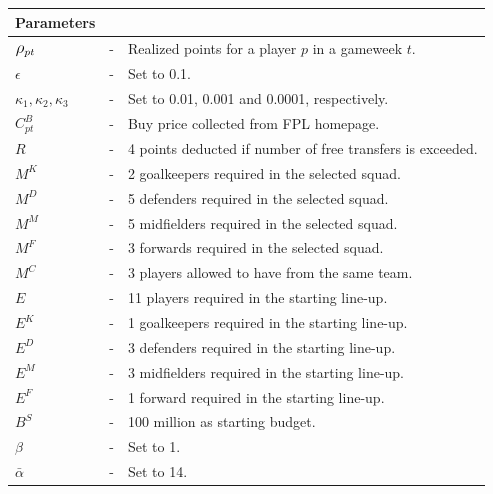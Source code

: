 \begin{table}[H] 
\tabcolsep=0.11cm
\centering
\begin{tabular}{@{}lll@{}}
\toprule
Parameters                       &   &                                                                                                \\ \midrule
$\mathlarger{\rho_{pt}}$ & - & Realized points for a player $p$ in a gameweek $t$. \\
$\epsilon$                       & - & Set to 0.1.                                                                     \\
$\kappa_{1}, \kappa_{2}, \kappa_{3} $                     & - & Set to 0.01, 0.001 and 0.0001, respectively.                                               \\
$C_{pt}^{B}$                     & - & Buy price collected from FPL homepage.  \\ 
$R$                              & - & 4 points deducted if number of free transfers is exceeded.       \\
$M^{K}$                          & - &  2 goalkeepers required in the selected squad.                                      \\
$M^{D}$                          & - &  5 defenders required in the selected squad.                         \\
$M^{M}$                          & - & 5 midfielders required in the selected squad.                                     \\
$M^{F}$                          & - & 3 forwards required in the selected squad.                                    \\
$M^{C}$                          & - & 3 players allowed to have from the same team.                                \\
$E$                              & - & 11 players required in the starting line-up.                              \\
$E^{K}$                          & - & 1 goalkeepers required in the starting line-up.                                       \\
$E^{D}$                          & - & 3 defenders required in the starting line-up.                  \\
$E^{M}$                          & - & 3 midfielders required in the starting line-up.                                 \\
$E^{F}$                          & - & 1 forward required in the starting line-up.                     \\
$B^{S}$                          & - & 100 million as starting budget.                                                                              \\
$\beta$                          & - & Set to 1.                                                                                  \\          
$\bar{\alpha}$                   & - & Set to 14.                                                                      \\


\end{tabular}
\end{table}
